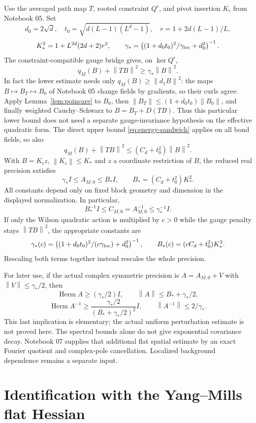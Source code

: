 \documentclass[11pt]{article}
\theoremstyle{remark}
\newcommand{\norm}[1]{\left\|#1\right\|}
\newcommand{\Herm}{\operatorname{Herm}}
\begin{document}
Use the averaged path map $T$, rooted constraint $Q^\flat$, and
pivot insertion $K_\flat$ from Notebook 05. Set
\[
 d_0=2\sqrt d,\quad
 t_0=\sqrt{d(L-1)(L^d-1)},\quad
 r=1+2d(L-1)/L,
\]
\[
 K_*^2=1+L^{2d}(2d+2)r^2,
 \qquad
 \gamma_*=
 \left((1+d_0t_0)^2/\gamma_{\rm loc}+d_0^2\right)^{-1}.
\]
The constraint-compatible gauge bridge gives, on $\ker Q^\flat$,
\[
 q_M(B)+\norm{TB}^2\ge\gamma_*\norm B^2.
\]
In fact the lower estimate needs only $q_M(B)\ge\norm{d_1B}^2$:
the maps $B\mapsto B_T\mapsto B_0$ of Notebook 05 change fields
by gradients, so their curls agree. Apply Lemma~\ref{lem:poincare}
to $B_0$, then $\norm{B_T}\le(1+d_0t_0)\norm{B_0}$, and finally
weighted Cauchy--Schwarz to $B=B_T+D(TB)$. Thus this particular
lower bound does not need a separate gauge-invariance hypothesis
on the effective quadratic form.
The direct upper bound \eqref{eq:energy-sandwich} applies on all
bond fields, so also
\[
 q_M(B)+\norm{TB}^2\le(C_d+t_0^2)\norm B^2.
\]
With $B=K_\flat z$, $\norm{K_\flat}\le K_*$ and $z$ a
coordinate restriction of $B$, the reduced real precision satisfies
\begin{equation}\label{eq:precision-sandwich}
 \gamma_*I\le A_{M,0}\le B_*I,
 \qquad B_*=(C_d+t_0^2)K_*^2.
\end{equation}
All constants depend only on fixed block geometry and dimension
in the displayed normalization. In particular,
\[
 B_*^{-1}I\le C_{M,0}=A_{M,0}^{-1}\le\gamma_*^{-1}I.
\]
If only the Wilson quadratic action is multiplied by $c>0$ while
the gauge penalty stays $\norm{TB}^2$, the appropriate constants are
\[
 \gamma_*(c)=
 \left((1+d_0t_0)^2/(c\gamma_{\rm loc})+d_0^2\right)^{-1},
 \qquad B_*(c)=(cC_d+t_0^2)K_*^2.
\]
Rescaling both terms together instead rescales the whole precision.

For later use, if the actual complex symmetric precision is
$A=A_{M,0}+V$ with $\norm V\le\gamma_*/2$, then
\[
 \Herm A\ge(\gamma_*/2)I,\qquad
 \norm A\le B_*+\gamma_*/2,
\]
\[
 \Herm A^{-1}\ge
 \frac{\gamma_*/2}{(B_*+\gamma_*/2)^2}I,
 \qquad\norm{A^{-1}}\le2/\gamma_*.
\]
This last implication is elementary; the actual uniform perturbation
estimate is not proved here. The spectral bounds alone do not give
exponential covariance decay. Notebook 07 supplies that additional
flat spatial estimate by an exact Fourier quotient and complex-pole
cancellation. Localized background dependence remains a separate input.

\section{Identification with the Yang--Mills flat Hessian}\label{sec:match}
\end{document}
